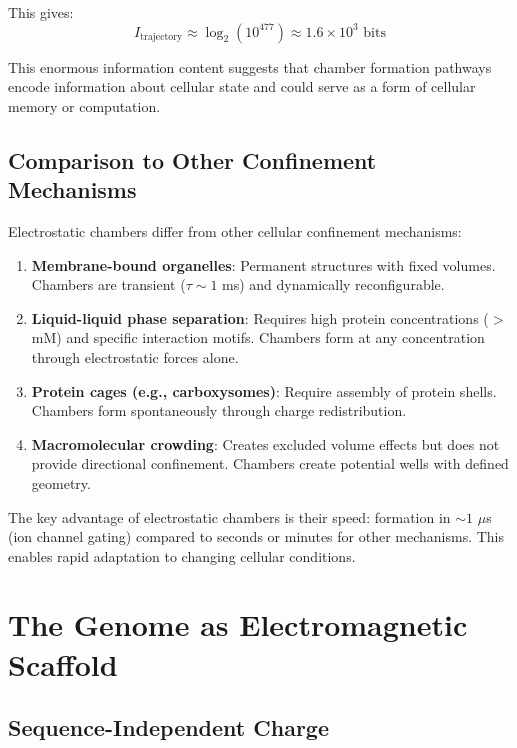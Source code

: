 \documentclass[twocolumn,10pt,aps,prd,superscriptaddress,floatfix,nofootinbib]{revtex4-2}
\theoremstyle{remark}
\begin{document}
This gives:
\begin{equation}
I_{\mathrm{trajectory}} \approx \log_2(10^{477}) \approx 1.6 \times 10^{3} \text{ bits}
\end{equation}

This enormous information content suggests that chamber formation pathways encode information about cellular state and could serve as a form of cellular memory or computation.

\subsection{Comparison to Other Confinement Mechanisms}

Electrostatic chambers differ from other cellular confinement mechanisms:

\begin{enumerate}
\item \textbf{Membrane-bound organelles}: Permanent structures with fixed volumes. Chambers are transient ($\tau \sim 1$ ms) and dynamically reconfigurable.

\item \textbf{Liquid-liquid phase separation}: Requires high protein concentrations ($>$ mM) and specific interaction motifs. Chambers form at any concentration through electrostatic forces alone.

\item \textbf{Protein cages (e.g., carboxysomes)}: Require assembly of protein shells. Chambers form spontaneously through charge redistribution.

\item \textbf{Macromolecular crowding}: Creates excluded volume effects but does not provide directional confinement. Chambers create potential wells with defined geometry.
\end{enumerate}

The key advantage of electrostatic chambers is their speed: formation in $\sim 1$ $\mu$s (ion channel gating) compared to seconds or minutes for other mechanisms. This enables rapid adaptation to changing cellular conditions.

\section{The Genome as Electromagnetic Scaffold}
\label{sec:genome}

\subsection{Sequence-Independent Charge}
\end{document}
